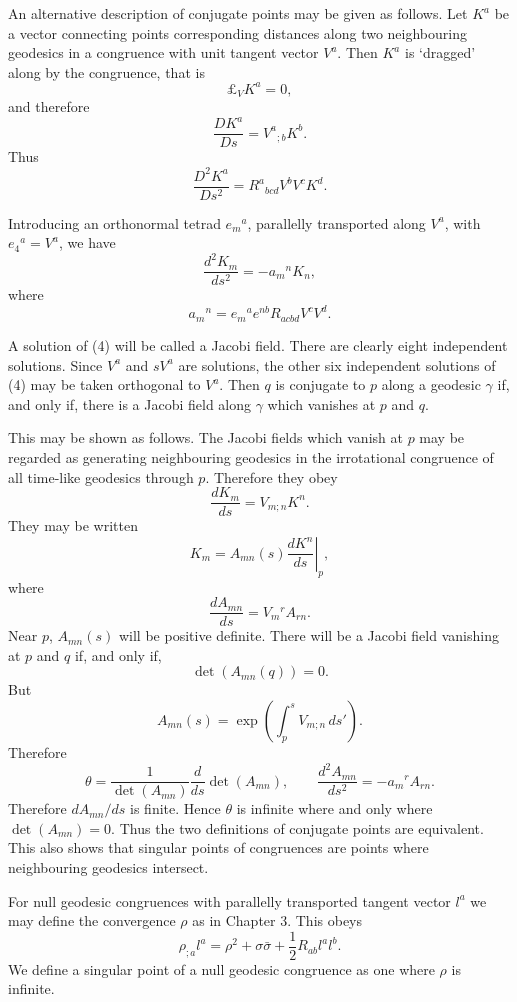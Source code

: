 An alternative description of conjugate points may be given as follows. Let
$K^a$ be a vector connecting points corresponding distances along two
neighbouring geodesics in a congruence with unit tangent vector $V^a$. Then
$K^a$ is `dragged' along by the congruence, that is
\[
\pounds_VK^a=0,
\]
and therefore
\begin{equation}
\frac{DK^a}{Ds}=V^a{}_{;b}K^b.
\tag{2}
\end{equation}
Thus
\begin{equation}
\frac{D^2K^a}{Ds^2}=R^a{}_{bcd}V^bV^cK^d.
\tag{3}
\end{equation}

Introducing an orthonormal tetrad $e_m{}^a$, parallelly transported along
$V^a$, with $e_4{}^a=V^a$, we have
\begin{equation}
\frac{d^2K_m}{ds^2}=-a_m{}^nK_n,
\tag{4}
\end{equation}
where
\[
a_m{}^n=e_m{}^a e^{nb}R_{acbd}V^cV^d.
\]

A solution of (4) will be called a Jacobi field. There are clearly eight
independent solutions. Since $V^a$ and $sV^a$ are solutions, the other six
independent solutions of (4) may be taken orthogonal to $V^a$. Then $q$ is
conjugate to $p$ along a geodesic $\gamma$ if, and only if, there is a Jacobi
field along $\gamma$ which vanishes at $p$ and $q$.

This may be shown as follows. The Jacobi fields which vanish at $p$ may be
regarded as generating neighbouring geodesics in the irrotational congruence
of all time-like geodesics through $p$. Therefore they obey
\[
\frac{dK_m}{ds}=V_{m;n}K^n.
\]
They may be written
\[
K_m=A_{mn}(s)\left.\frac{dK^n}{ds}\right|_p,
\]
where
\[
\frac{dA_{mn}}{ds}=V_m{}^rA_{rn}.
\]
Near $p$, $A_{mn}(s)$ will be positive definite. There will be a Jacobi field
vanishing at $p$ and $q$ if, and only if,
\[
\det\!\left(A_{mn}(q)\right)=0.
\]
But
\[
A_{mn}(s)=\exp\!\left(\int_p^s V_{m;n}\,ds'\right).
\]
Therefore
\[
\theta=\frac{1}{\det(A_{mn})}\frac{d}{ds}\det(A_{mn}),
\qquad
\frac{d^2A_{mn}}{ds^2}=-a_m{}^rA_{rn}.
\]
Therefore $dA_{mn}/ds$ is finite. Hence $\theta$ is infinite where and only
where $\det(A_{mn})=0$. Thus the two definitions of conjugate points are
equivalent. This also shows that singular points of congruences are points
where neighbouring geodesics intersect.

For null geodesic congruences with parallelly transported tangent vector
$l^a$ we may define the convergence $\rho$ as in Chapter 3. This obeys
\begin{equation}
\rho_{;a}l^a
=\rho^2+\sigma\bar{\sigma}+\frac{1}{2}R_{ab}l^al^b.
\tag{5}
\end{equation}
We define a singular point of a null geodesic congruence as one where $\rho$
is infinite.

